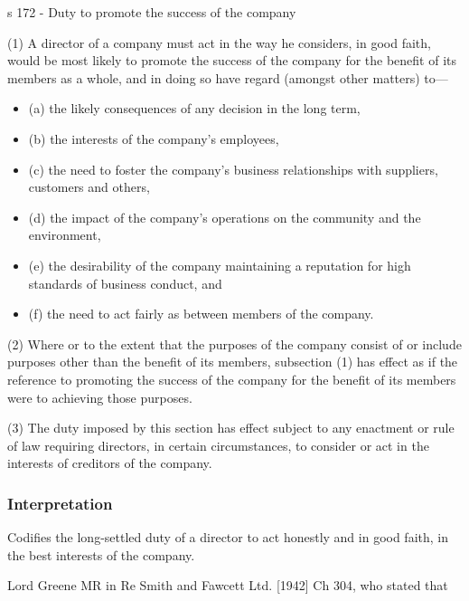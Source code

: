 \documentclass[
]{article}
\providecommand{\tightlist}{%
  \setlength{\itemsep}{0pt}\setlength{\parskip}{0pt}}
\newenvironment{env-136e818f-6bd8-45c9-b7d8-e6b8925f9e62}
{
    \savenotes\tcolorbox[blanker,breakable,left=5pt,borderline west={2pt}{-4pt}{green}]
}
{
    \endtcolorbox\spewnotes
}
\begin{document}
\begin{env-136e818f-6bd8-45c9-b7d8-e6b8925f9e62}

s 172 - Duty to promote the success of the company

(1) A director of a company must act in the way he considers, in good
faith, would be most likely to promote the success of the company for
the benefit of its members as a whole, and in doing so have regard
(amongst other matters) to---

\begin{itemize}
\tightlist
\item
  (a) the likely consequences of any decision in the long term,
\item
  (b) the interests of the company's employees,
\item
  (c) the need to foster the company's business relationships with
  suppliers, customers and others,
\item
  (d) the impact of the company's operations on the community and the
  environment,
\item
  (e) the desirability of the company maintaining a reputation for high
  standards of business conduct, and
\item
  (f) the need to act fairly as between members of the company.
\end{itemize}

(2) Where or to the extent that the purposes of the company consist of
or include purposes other than the benefit of its members, subsection
(1) has effect as if the reference to promoting the success of the
company for the benefit of its members were to achieving those purposes.

(3) The duty imposed by this section has effect subject to any enactment
or rule of law requiring directors, in certain circumstances, to
consider or act in the interests of creditors of the company.

\end{env-136e818f-6bd8-45c9-b7d8-e6b8925f9e62}

\hypertarget{interpretation}{%
\subsubsection{Interpretation}\label{interpretation}}

Codifies the long-settled duty of a director to act honestly and in good
faith, in the best interests of the company.

Lord Greene MR in Re Smith and Fawcett Ltd. {[}1942{]} Ch 304, who
stated that
\end{document}
